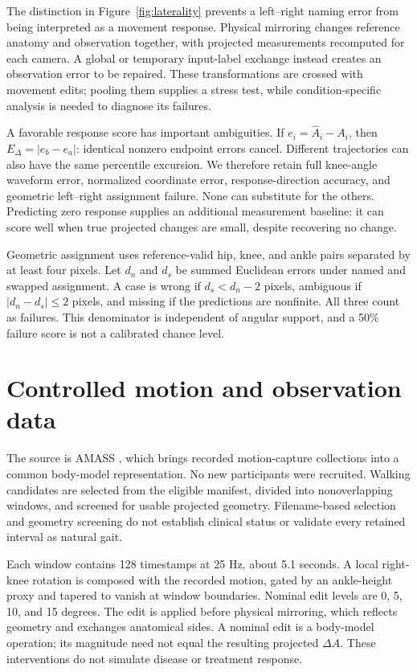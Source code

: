 \documentclass{article}
\begin{document}
The distinction in Figure~\ref{fig:laterality} prevents a left--right naming error from being interpreted as a movement response. Physical mirroring changes reference anatomy and observation together, with projected measurements recomputed for each camera. A global or temporary input-label exchange instead creates an observation error to be repaired. These transformations are crossed with movement edits; pooling them supplies a stress test, while condition-specific analysis is needed to diagnose its failures.

A favorable response score has important ambiguities. If $e_i=\widehat A_i-A_i$, then $E_\Delta=|e_b-e_a|$: identical nonzero endpoint errors cancel. Different trajectories can also have the same percentile excursion. We therefore retain full knee-angle waveform error, normalized coordinate error, response-direction accuracy, and geometric left--right assignment failure. None can substitute for the others. Predicting zero response supplies an additional measurement baseline: it can score well when true projected changes are small, despite recovering no change.

Geometric assignment uses reference-valid hip, knee, and ankle pairs separated by at least four pixels. Let $d_n$ and $d_s$ be summed Euclidean errors under named and swapped assignment. A case is wrong if $d_s<d_n-2$ pixels, ambiguous if $|d_n-d_s|\leq2$ pixels, and missing if the predictions are nonfinite. All three count as failures. This denominator is independent of angular support, and a 50\% failure score is not a calibrated chance level.

\clearpage
\section{Controlled motion and observation data}
The source is AMASS \citep{mahmood2019amass}, which brings recorded motion-capture collections into a common body-model representation. No new participants were recruited. Walking candidates are selected from the eligible manifest, divided into nonoverlapping windows, and screened for usable projected geometry. Filename-based selection and geometry screening do not establish clinical status or validate every retained interval as natural gait.

Each window contains 128 timestamps at 25 Hz, about 5.1 seconds. A local right-knee rotation is composed with the recorded motion, gated by an ankle-height proxy and tapered to vanish at window boundaries. Nominal edit levels are 0, 5, 10, and 15 degrees. The edit is applied before physical mirroring, which reflects geometry and exchanges anatomical sides. A nominal edit is a body-model operation; its magnitude need not equal the resulting projected $\Delta A$. These interventions do not simulate disease or treatment response.
\end{document}
